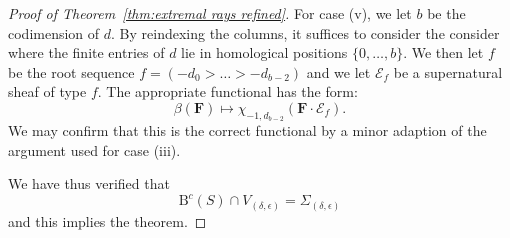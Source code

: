 \documentclass[12pt]{amsart}
\theoremstyle{definition}
\theoremstyle{remark}
\newcommand{\codim}{\operatorname{codim}}
\newcommand{\cc}{c}
\newcommand{\dd}{d}
\newcommand{\cE}{\mathcal{E}}
\newcommand{\FF}{\mathbf{F}}
\newcommand{\BBQ}{\mathrm{B}}
\begin{document}
\begin{proof}[Proof of Theorem~\ref{thm:extremal rays refined}]
For case (v), we let $b$ be the codimension of $\dd$.  By reindexing the columns, it suffices to consider the consider where the finite entries of $\dd$ lie in homological positions $\{0,\dots,b\}$.  We then let $f$ be the root sequence $f=(-d_0>\dots >-d_{b-2})$ and we let $\cE_f$ be a supernatural sheaf of type $f$.  The appropriate functional has the form:
\[
\beta(\FF)\mapsto \chi_{-1,d_{b-2}}(\FF\cdot \cE_f).
\]
We may confirm that this is the correct functional by a minor adaption of the argument used for case (iii).
%
%

We have thus verified that
\[
\BBQ^{\cc}(S)\cap V_{(\delta,\epsilon)}=\Sigma_{(\delta,\epsilon)}
\]
and this implies the theorem.
\end{proof}

\end{document}
